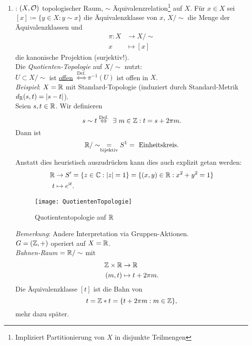 \begin{remark}
\begin{enumerate}
    \item {}: \( (X, \mathcal{O}) \) topologischer Raum, \( \sim \) Äquivalenzrelation\footnote{Impliziert Partitionierung von \( X \) in disjunkte Teilmengen} auf \( X \). Für \( x \in X \) sei \( [x] \coloneqq  \{ y \in X : y \sim x \} \) die Äquivalenzklasse von \( x \), \( X/\sim \) die Menge der Äquivalenzklassen und
    \begin{align*}
      \pi : X &\to X/\sim \\
      x &\mapsto [x]
    \end{align*}
    die kanonische Projektion (surjektiv!). \\
    Die \emph{Quotienten-Topologie} auf \( X/\sim \) nutzt: \\
    \( U \subset X/\sim \) ist \underline{offen} \( \overset{\text{Def.}}{\Leftrightarrow} \pi^{-1}(U) \) ist offen in \( X \). \\
    \emph{Beispiel}: \( X = \mathbb{R} \) mit Standard-Topologie (induziert durch Standard-Metrik \( d_{\mathbb{R}}(s,t) = \vert s-t \vert \)). \\
    Seien \( s, t \in \mathbb{R} \). Wir definieren
    \begin{equation*}
      s \sim t \overset{\text{Def.}}{\Leftrightarrow} \ \exists \ m \in \mathbb{Z} : t = s + 2\pi m\text{.}
    \end{equation*}
    Dann ist
    \begin{equation*}
      \mathbb{R}/\sim \underset{\text{bijektiv}}{=} S^1 = \text{ Einheitskreis}\text{.}
    \end{equation*}
    Anstatt dies heuristisch auszudrücken kann dies auch explizit getan werden:
    \begin{align*}
      \mathbb{R} &\to S' = \{ z \in \mathbb{C} : \vert z \vert = 1 \} = \{ (x, y) \in \mathbb{R} : x^2+y^2 = 1 \} \\
      t &\mapsto e^{\text{\rmfamily i} t}\text{.}
    \end{align*}
    \begin{figure}[H]
      \texttt{[image: QuotientenTopologie]}
      \caption{Quotiententopologie auf \( \mathbb{R} \)}
    \end{figure}
    \emph{Bemerkung}: Andere Interpretation via Gruppen-Aktionen. \\
    \( G = (\mathbb{Z}, +) \) operiert auf \( X = \mathbb{R} \). \\
    \emph{Bahnen-Raum} \( = \mathbb{R}/\sim \) mit
    \begin{align*}
      \mathbb{Z} \times \mathbb{R} &\to \mathbb{R} \\
      (m, t) &\mapsto t + 2\pi m\text{.}
    \end{align*}
    Die Äquivalenzklasse \( [t] \) ist die Bahn von
    \begin{equation*}
      t = \mathbb{Z}*t = \{ t+2\pi m : m \in \mathbb{Z} \}\text{,}
    \end{equation*}
    mehr dazu später.
  \end{enumerate}
\end{remark}

